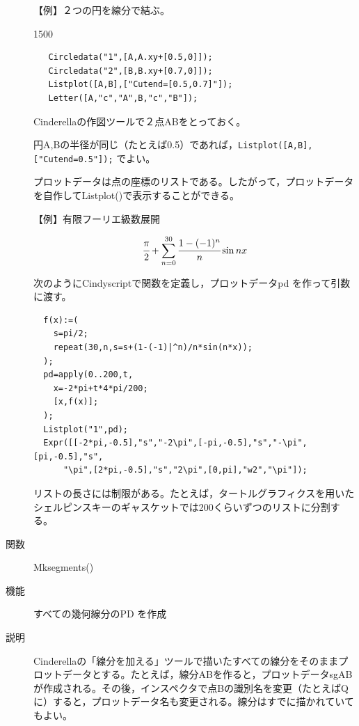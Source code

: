 \documentclass[papersize,a4paper,12pt,uplatex]{jsarticle}
\begin{document}
\begin{description}
\vspace{\baselineskip}
【例】２つの円を線分で結ぶ。
  
\begin{layer}{150}{0}
\end{layer}
\hspace{20mm}

\begin{verbatim}
   Circledata("1",[A,A.xy+[0.5,0]]);
   Circledata("2",[B,B.xy+[0.7,0]]);
   Listplot([A,B],["Cutend=[0.5,0.7]"]);
   Letter([A,"c","A",B,"c","B"]);
\end{verbatim}
  Cinderellaの作図ツールで２点ABをとっておく。

円A,Bの半径が同じ（たとえば0.5）であれば，\verb|Listplot([A,B],["Cutend=0.5"]);| でよい。

\vspace{\baselineskip}
プロットデータは点の座標のリストである。したがって，プロットデータを自作してListplot()で表示することができる。

\vspace{\baselineskip}
【例】有限フーリエ級数展開

           \[\cfrac{\pi}{2}+\sum_{n=0}^{30} \cfrac{1-(-1)^n}{n}\sin nx\]

次のようにCindyscriptで関数を定義し，プロットデータpd を作って引数に渡す。
\begin{verbatim}
  f(x):=(
    s=pi/2;
    repeat(30,n,s=s+(1-(-1)|^n)/n*sin(n*x));
  );
  pd=apply(0..200,t,
    x=-2*pi+t*4*pi/200;
    [x,f(x)];
  );
  Listplot("1",pd);
  Expr([[-2*pi,-0.5],"s","-2\pi",[-pi,-0.5],"s","-\pi",[pi,-0.5],"s",
      "\pi",[2*pi,-0.5],"s","2\pi",[0,pi],"w2","\pi"]);
\end{verbatim}

\vspace{\baselineskip}
\hspace{20mm}

\vspace{\baselineskip}
 リストの長さには制限がある。たとえば，タートルグラフィクスを用いたシェルピンスキーのギャスケットでは200くらいずつのリストに分割する。
 
 \hspace{20mm} 

\vspace{\baselineskip}
\hypertarget{mksegments}{}
\item[関数]  Mksegments()
\item[機能]  すべての幾何線分のPD を作成
\item[説明]  Cinderellaの「線分を加える」ツールで描いたすべての線分をそのままプロットデータとする。たとえば，線分ABを作ると，プロットデータsgABが作成される。その後，インスペクタで点Bの識別名を変更（たとえばQに）すると，プロットデータ名も変更される。線分はすでに描かれていてもよい。


\end{description}
\end{document}
